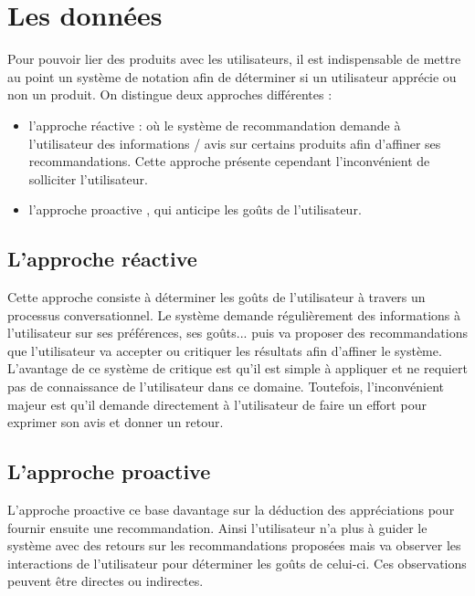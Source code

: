 \section{Les données}
Pour pouvoir lier des produits avec les utilisateurs, il est indispensable de mettre au point un système de notation afin de déterminer si un utilisateur apprécie ou non un produit.
On distingue deux approches différentes :
\begin{itemize}
  \item l'approche \og réactive \fg : où le système de recommandation demande à l'utilisateur des informations / avis sur certains produits afin d'affiner ses recommandations. Cette approche présente cependant l'inconvénient de solliciter l'utilisateur.
  \item l'approche \og proactive \fg, qui anticipe les goûts de l'utilisateur.
\end{itemize}

\subsection{L'approche réactive}
Cette approche consiste à déterminer les goûts de l'utilisateur à travers un processus conversationnel. Le système demande régulièrement des informations à l'utilisateur sur ses préférences, ses goûts... puis va proposer des recommandations que l'utilisateur va accepter ou critiquer les résultats afin d'affiner le système.
L'avantage de ce système de critique est qu'il est simple à appliquer et ne requiert pas de connaissance de l'utilisateur dans ce domaine. Toutefois, l'inconvénient majeur est qu'il demande directement à l'utilisateur de faire un effort pour exprimer son avis et donner un retour.

\subsection{L'approche proactive}
L'approche proactive ce base davantage sur la déduction des appréciations pour fournir ensuite une recommandation. Ainsi l'utilisateur n'a plus à guider le système avec des retours sur les recommandations proposées mais va observer les interactions de l'utilisateur pour déterminer les goûts de celui-ci.
Ces observations peuvent être directes ou indirectes.

